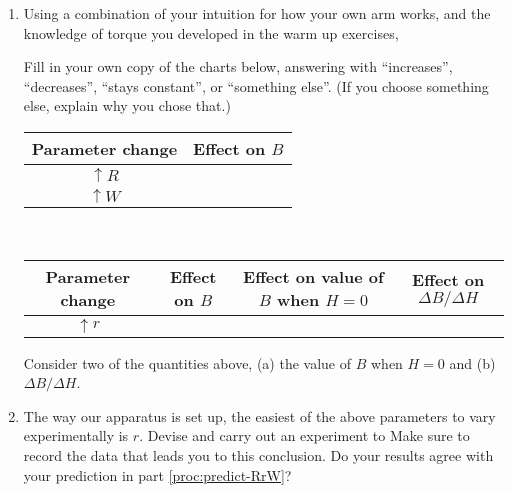 \begin{enumerate}[labproc]
\item \label{proc:predict-RrW}
Using a combination of your intuition for how your own arm works,
and the knowledge of torque you developed in the warm up exercises,

Fill in your own copy of the charts below, 
answering with ``increases'', ``decreases'', 
``stays constant'', or ``something else''.  
(If you choose something else, explain why you chose that.)
\vspace{.5cm}
\\
\begin{tabular}{|c||c|}
	\hline
	Parameter change & Effect on $B$ 
	\\ \hline \hline
	$\uparrow R$ 
	& %
	\\ \hline
	$\uparrow W$ 
	& %
	\\ \hline
\end{tabular}\\
\vspace{1cm}
\begin{tabular}{|c||c|c|c|}
	\hline
	Parameter change & Effect on $B$ 
	& Effect on value of $B$ when $H=0$
	& Effect on $\Delta B/\Delta H$ 
	\\ \hline \hline
	$\uparrow r$ 
	& & & 
	\\ \hline
\end{tabular}

Consider two of the quantities above, 
(a) the value of $B$ when $H=0$ 
and (b) $\Delta B/\Delta H$.



\item
The way our apparatus is set up, 
the easiest of the above parameters to vary experimentally is $r$.
Devise and carry out an experiment to 
Make sure to record the data that leads you to this conclusion.
Do your results agree with your prediction 
in part \ref{proc:predict-RrW}?


\end{enumerate}
